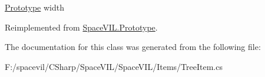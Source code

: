 \mbox{\hyperlink{class_space_v_i_l_1_1_prototype}{Prototype}} width 



Reimplemented from \mbox{\hyperlink{class_space_v_i_l_1_1_prototype_a6a4f1b9581f4d18f1c3a3e287d4b2a2b}{Space\+V\+I\+L.\+Prototype}}.



The documentation for this class was generated from the following file\+:\begin{DoxyCompactItemize}
\item 
F\+:/spacevil/\+C\+Sharp/\+Space\+V\+I\+L/\+Space\+V\+I\+L/\+Items/Tree\+Item.\+cs\end{DoxyCompactItemize}

